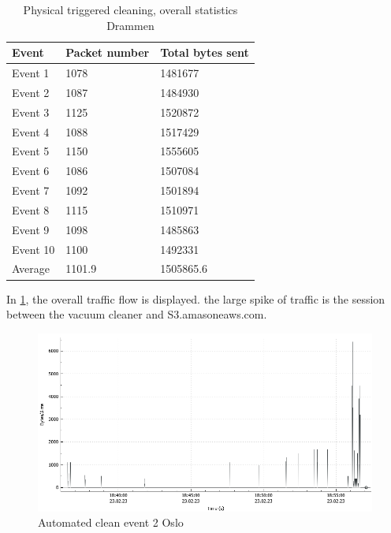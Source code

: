 \begin{table}[H]
\centering
\caption{Physical triggered cleaning, overall statistics Drammen}
\label{tab:PCoverallDRA}
\begin{tabular}{|l|l|l|}
\hline
\textbf{Event} & \textbf{Packet number} & \textbf{Total bytes sent} \\ \hline
Event 1        & 1078                   & 1481677                   \\ \hline
Event 2        & 1087                   & 1484930                   \\ \hline
Event 3        & 1125                   & 1520872                   \\ \hline
Event 4        & 1088                   & 1517429                   \\ \hline
Event 5        & 1150                   & 1555605                   \\ \hline
Event 6        & 1086                   & 1507084                   \\ \hline
Event 7        & 1092                   & 1501894                   \\ \hline
Event 8        & 1115                   & 1510971                   \\ \hline
Event 9        & 1098                   & 1485863                   \\ \hline
Event 10       & 1100                   & 1492331                   \\ \hline
Average        & 1101.9                 & 1505865.6                 \\ \hline
\end{tabular}
\end{table}

In \ref{fig:Pc-graph}, the overall traffic flow is displayed. the large spike of traffic is the session between the vacuum cleaner and S3.amasoneaws.com.
\begin{figure}[H]
    \centering
    \includegraphics[width=\textwidth]{figures/PC-graph.png}
    \caption{Automated clean event 2 Oslo}
    \label{fig:Pc-graph}
\end{figure}

